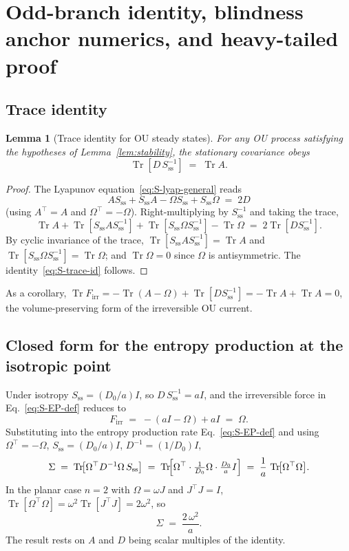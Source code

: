 \documentclass[%
 reprint,
 superscriptaddress,
 nofootinbib,
 nobibnotes,
 amsmath,amssymb,
 aps,
 prl,
 floatfix,
]{revtex4-2}
\newcommand{\Sss}{S_{\mathrm{ss}}}
\newcommand{\Firr}{F_{\mathrm{irr}}}
\newcommand{\Tr}{\operatorname{Tr}}
\newtheorem{lemma}{Lemma}
\begin{document}
\section{Odd-branch identity, blindness anchor numerics, and heavy-tailed proof}\label{app:odd}

\subsection{Trace identity}\label{app:trace-id}

\begin{lemma}[Trace identity for OU steady states]\label{lem:trace-id}
For any OU process satisfying the hypotheses of Lemma~\ref{lem:stability}, the stationary covariance obeys
\begin{equation}\label{eq:S-trace-id}
\Tr[D\,\Sss^{-1}] \;=\; \Tr A.
\end{equation}
\end{lemma}
\begin{proof}
The Lyapunov equation~\eqref{eq:S-lyap-general} reads
\[
A \Sss + \Sss A - \Omega \Sss + \Sss \Omega \;=\; 2 D
\]
(using $A^\top = A$ and $\Omega^\top = -\Omega$). Right-multiplying by $\Sss^{-1}$ and taking the trace,
\[
\Tr A + \Tr[\Sss A \Sss^{-1}] + \Tr[\Sss \Omega \Sss^{-1}] - \Tr \Omega \;=\; 2 \Tr[D \Sss^{-1}].
\]
By cyclic invariance of the trace, $\Tr[\Sss A \Sss^{-1}] = \Tr A$ and $\Tr[\Sss \Omega \Sss^{-1}] = \Tr \Omega$; and $\Tr \Omega = 0$ since $\Omega$ is antisymmetric. The identity~\eqref{eq:S-trace-id} follows.
\end{proof}

\noindent As a corollary, $\Tr \Firr = -\Tr(A - \Omega) + \Tr[D\Sss^{-1}] = -\Tr A + \Tr A = 0$, the volume-preserving form of the irreversible OU current.

\subsection{Closed form for the entropy production at the isotropic point}\label{app:Sigma-iso}

Under isotropy $\Sss = (D_0/a) I$, so $D\,\Sss^{-1} = a I$, and the irreversible force in Eq.~\eqref{eq:S-EP-def} reduces to
\[
\Firr \;=\; -(a I - \Omega) + a I \;=\; \Omega.
\]
Substituting into the entropy production rate Eq.~\eqref{eq:S-EP-def} and using $\Omega^\top = -\Omega$, $\Sss = (D_0/a) I$, $D^{-1} = (1/D_0) I$,
\[
\Sigma \;=\; \Tr\!\bigl[\Omega^\top D^{-1} \Omega\,\Sss\bigr] \;=\; \Tr\!\Bigl[\Omega^\top \cdot \tfrac{1}{D_0}\Omega \cdot \tfrac{D_0}{a} I\Bigr] \;=\; \frac{1}{a}\,\Tr\!\bigl[\Omega^\top \Omega\bigr].
\]
In the planar case $n = 2$ with $\Omega = \omega J$ and $J^\top J = I$, $\Tr[\Omega^\top \Omega] = \omega^2 \Tr[J^\top J] = 2\omega^2$, so
\begin{equation}\label{eq:S-Sigma-iso}
\Sigma \;=\; \frac{2\,\omega^2}{a}.
\end{equation}
The result rests on $A$ and $D$ being scalar multiples of the identity.
\end{document}
